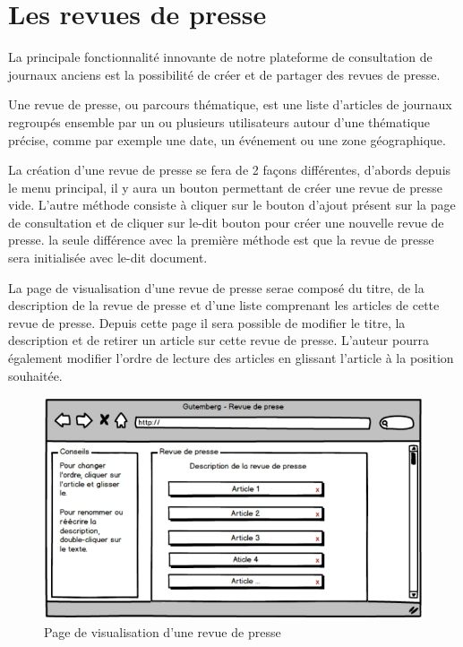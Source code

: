 \section{Les revues de presse}
\label{sec:revue}

La principale fonctionnalité innovante de notre plateforme de consultation de journaux anciens est la possibilité de
créer et de partager des revues de presse.

Une revue de presse, ou parcours thématique, est une liste d'articles de journaux regroupés ensemble par un ou plusieurs
utilisateurs autour d'une thématique précise, comme par exemple une date, un événement ou une zone géographique.

La création d'une revue de presse se fera de 2 façons différentes, d'abords depuis le menu principal, il y aura un bouton permettant de créer
une revue de presse vide. L'autre méthode consiste à cliquer sur le bouton d'ajout présent sur la page de consultation et de cliquer
sur le-dit bouton pour créer une nouvelle revue de presse.
la seule différence avec la première méthode est que la revue de presse sera initialisée avec le-dit document.

La page de visualisation d'une revue de presse serae composé du titre, de la description de la revue de presse et d'une liste comprenant les articles
de cette revue de presse. Depuis cette page il sera possible de modifier le titre, la description et de retirer un article sur cette revue de presse.
L'auteur pourra également modifier l'ordre de lecture des articles  en glissant l'article à la position souhaitée.

\begin{figure}[H]
    \centering
    \includegraphics[width=\textwidth]{figures/revue.png}
    \caption{Page de visualisation d'une revue de presse}
    \label{fig:revue}
\end{figure}

